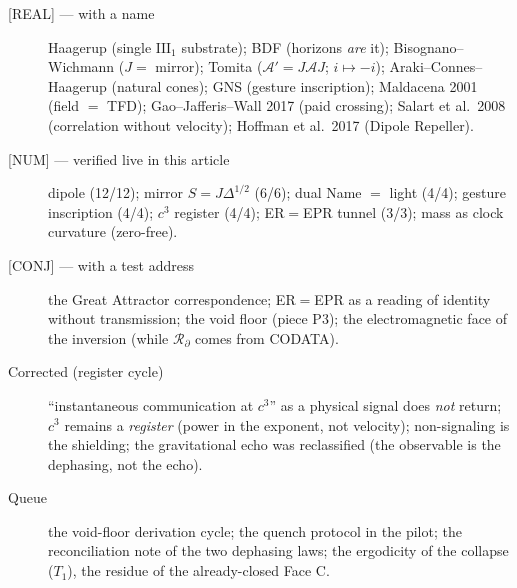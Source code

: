 \documentclass[11pt]{article}
\theoremstyle{definition}\newtheorem{deriv}{Derivation}
\begin{document}
\begin{description}\item[\textsf{[REAL]} --- with a name] Haagerup (single $\mathrm{III}_1$ substrate); BDF (horizons \emph{are} it); Bisognano--Wichmann ($J=$ mirror); Tomita ($\mathcal{A}'=J\mathcal{A}J$; $i\mapsto-i$); Araki--Connes--Haagerup (natural cones); GNS (gesture inscription); Maldacena 2001 (field $=$ TFD); Gao--Jafferis--Wall 2017 (paid crossing); Salart et al.\ 2008 (correlation without velocity); Hoffman et al.\ 2017 (Dipole Repeller).\item[\textsf{[NUM]} --- verified live in this article] dipole (12/12); mirror $S=J\Delta^{1/2}$ (6/6); dual Name $=$ light (4/4); gesture inscription (4/4); $c^3$ register (4/4); ER$=$EPR tunnel (3/3); mass as clock curvature (zero-free).\item[\textsf{[CONJ]} --- with a test address] the Great Attractor correspondence; ER$=$EPR as a reading of identity without transmission; the void floor (piece P3); the electromagnetic face of the inversion (while $\mathcal{R}_\partial$ comes from CODATA).\item[Corrected (register cycle)] ``instantaneous communication at $c^3$'' as a physical signal does \emph{not} return; $c^3$ remains a \emph{register} (power in the exponent, not velocity); non-signaling is the shielding; the gravitational echo was reclassified (the observable is the dephasing, not the echo).\item[Queue] the void-floor derivation cycle; the quench protocol in the pilot; the reconciliation note of the two dephasing laws; the ergodicity of the collapse ($T_1$), the residue of the already-closed Face C.\end{description}
\end{document}
